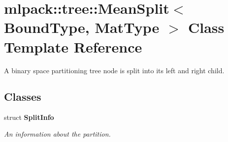 \section{mlpack\+:\+:tree\+:\+:Mean\+Split$<$ Bound\+Type, Mat\+Type $>$ Class Template Reference}
\label{classmlpack_1_1tree_1_1MeanSplit}


A binary space partitioning tree node is split into its left and right child.  


\subsection*{Classes}
\begin{DoxyCompactItemize}
\item 
struct {\bf Split\+Info}
\begin{DoxyCompactList}\small\item\em An information about the partition. \end{DoxyCompactList}\end{DoxyCompactItemize}
